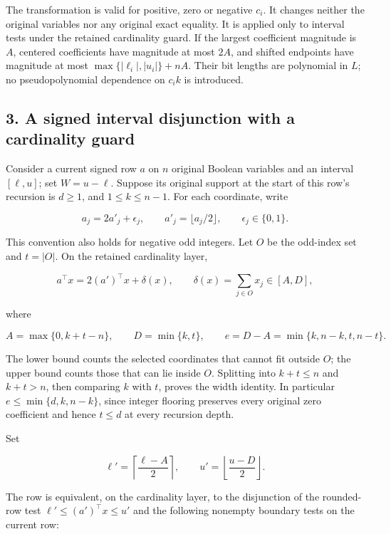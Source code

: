 The transformation is valid for positive, zero or negative \(c_i\). It changes neither the original variables nor any original exact equality. It is applied only to interval tests under the retained cardinality guard. If the largest coefficient magnitude is \(A\), centered coefficients have magnitude at most \(2A\), and shifted endpoints have magnitude at most \(\max\{|\ell_i|,|u_i|\}+nA\). Their bit lengths are polynomial in \(L\); no pseudopolynomial dependence on \(c_i k\) is introduced.

\hypertarget{af-2bf1c1784c-a-signed-interval-disjunction-with-a-cardinality-guard}{%
\subsection{3. A signed interval disjunction with a cardinality guard}\label{af-2bf1c1784c-a-signed-interval-disjunction-with-a-cardinality-guard}}

Consider a current signed row \(a\) on \(n\) original Boolean variables and an interval \([\ell,u]\); set \(W=u-\ell\). Suppose its original support at the start of this row's recursion is \(d\ge1\), and \(1\le k\le n-1\). For each coordinate, write

\[
a_j=2a'_j+\epsilon_j,\qquad
 a'_j=\lfloor a_j/2\rfloor,\qquad \epsilon_j\in\{0,1\}.
\]

This convention also holds for negative odd integers. Let \(O\) be the odd-index set and \(t=|O|\). On the retained cardinality layer,

\[
a^\top x=2(a')^\top x+\delta(x),\qquad
\delta(x)=\sum_{j\in O}x_j\in[A,D],
\]

where

\[
A=\max\{0,k+t-n\},\qquad D=\min\{k,t\},\qquad
 e=D-A=\min\{k,n-k,t,n-t\}.
\]

The lower bound counts the selected coordinates that cannot fit outside \(O\); the upper bound counts those that can lie inside \(O\). Splitting into \(k+t\le n\) and \(k+t>n\), then comparing \(k\) with \(t\), proves the width identity. In particular \(e\le\min\{d,k,n-k\}\), since integer flooring preserves every original zero coefficient and hence \(t\le d\) at every recursion depth.

Set

\[
\ell'=\left\lceil\frac{\ell-A}{2}\right\rceil,\qquad
 u'=\left\lfloor\frac{u-D}{2}\right\rfloor.
\]

The row is equivalent, on the cardinality layer, to the disjunction of the rounded-row test \(\ell'\le(a')^\top x\le u'\) and the following nonempty boundary tests on the current row:

